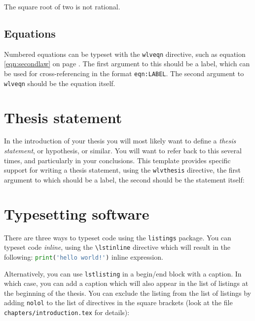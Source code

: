 \begin{lemma}
\label{thm:two}
The square root of two is not rational.
\end{lemma}

\subsection{Equations}

Numbered equations can be typeset with the \verb!wlveqn! directive,
such as equation \ref{eqn:secondlaw} on page
\pageref{eqn:secondlaw}. The first argument to this should be a label,
which can be used for cross-referencing in the format
\verb!eqn:LABEL!. The second argument to \verb!wlveqn! should be the
equation itself.



\section{Thesis statement}


In the introduction of your thesis you will most likely want to define
a \emph{thesis statement}, or hypothesis, or similar. You will want to
refer back to this several times, and particularly in your
conclusions. This template provides specific support for writing a
thesis statement, using the \verb!wlvthesis! directive, the first
argument to which should be a label, the second should be the
statement itself:



\section{Typesetting software}

There are three ways to typeset code using the \verb!listings!
  package. You can typeset code \emph{inline}, using the
  \verb!\lstinline! directive which will result in the following:
  \lstinline[language=Python]$print('hello world!')$ inline
  expression.

Alternatively, you can use \verb!lstlisting! in a begin/end block with
a caption. In which case, you can add a caption which will also appear
in the list of listings at the beginning of the thesis. You can
exclude the listing from the list of listings by adding \verb!nolol!
to the list of directives in the square brackets (look at the file 
\verb!chapters/introduction.tex! for details):

